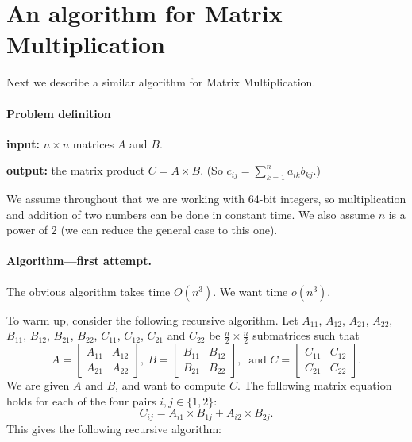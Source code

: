 \newpage


\section{An algorithm for Matrix Multiplication}
Next we describe a similar algorithm for Matrix Multiplication.

\paragraph{Problem definition}
\begin{mylist}
\item \textbf{input:}
  $n\times n$ matrices $A$ and $B$.
\item \textbf{output:} the matrix product $C = A \times B$.
  (So $c_{ij} = \sum_{k=1}^n a_{ik} b_{kj}$.)
\end{mylist}

We assume throughout that we are working with 64-bit integers,
so multiplication and addition of two numbers can be done in constant time.
We also assume $n$ is a power of 2
(we can reduce the general case to this one).

\paragraph{Algorithm---first attempt.}
The obvious algorithm takes time $O(n^3)$.
We want time $o(n^3)$.

To warm up, consider the following recursive algorithm.
Let $A_{11}$, $A_{12}$, $A_{21}$, $A_{22}$,
$B_{11}$, $B_{12}$, $B_{21}$, $B_{22}$,
$C_{11}$, $C_{12}$, $C_{21}$ and $C_{22}$
be $\frac{n}{2} \times \frac{n}{2}$
submatrices such that
\[
A = \left[ \begin{array}{ll} A_{11} & A_{12} \\A_{21} & A_{22}\end{array}\right],~{}
B = \left[ \begin{array}{ll} B_{11} & B_{12} \\B_{21} & B_{22}\end{array}\right],~{}
\text{ and }
C = \left[ \begin{array}{ll} C_{11} & C_{12} \\C_{21} & C_{22}\end{array}\right].
\]
We are given $A$ and $B$, and want to compute $C$.
The following matrix equation holds for each of the four pairs $i,j\in\{1,2\}$:
\begin{equation}\label{dc: matrix recurrence 1}
  C_{ij} = A_{i1} \times B_{1j} + A_{i2} \times B_{2j}.
\end{equation}
This gives the following recursive algorithm:

